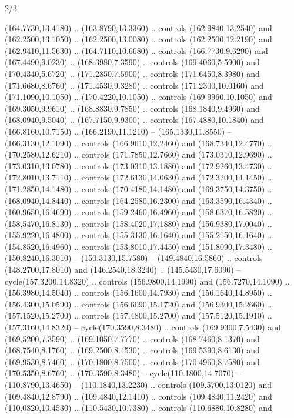 \begin{flagdescription}{2/3}
\begin{scope}[xshift=0.5\flaglength,yshift=0.5\flagwidth,scale=\stretchfactor]
\begin{scope}[scale=0.001645\flagwidth,yshift=65mm,xshift=-63mm]
\begin{scope}[y=0.80pt, x=0.80pt, yscale=-1,]
\begin{scope}[cm={{1.33333,0.0,0.0,1.33333,(0.0,1e-05)}}]
  (164.7730,13.4180) .. (163.8790,13.3360) .. controls (162.9840,13.2540) and
  (162.2500,13.1050) .. (162.2500,13.0080) .. controls (162.2500,12.2190) and
  (162.9410,11.5630) .. (164.7110,10.6680) .. controls (166.7730,9.6290) and
  (167.4490,9.0230) .. (168.3980,7.3590) .. controls (169.4060,5.5900) and
  (170.4340,5.6720) .. (171.2850,7.5900) .. controls (171.6450,8.3980) and
  (171.6680,8.6760) .. (171.4530,9.3280) .. controls (171.2300,10.0160) and
  (171.1090,10.1050) .. (170.4220,10.1050) .. controls (169.9960,10.1050) and
  (169.3050,9.9610) .. (168.8830,9.7850) .. controls (168.1840,9.4960) and
  (168.0940,9.5040) .. (167.7150,9.9300) .. controls (167.4880,10.1840) and
  (166.8160,10.7150) .. (166.2190,11.1210) -- (165.1330,11.8550) --
  (166.3130,12.1090) .. controls (166.9610,12.2460) and (168.7340,12.4770) ..
  (170.2580,12.6210) .. controls (171.7850,12.7660) and (173.0310,12.9690) ..
  (173.0310,13.0780) .. controls (173.0310,13.1880) and (172.9260,13.4730) ..
  (172.8010,13.7110) .. controls (172.6130,14.0630) and (172.3200,14.1450) ..
  (171.2850,14.1480) .. controls (170.4180,14.1480) and (169.3750,14.3750) ..
  (168.0940,14.8440) .. controls (164.2580,16.2300) and (163.3590,16.4340) ..
  (160.9650,16.4690) .. controls (159.2460,16.4960) and (158.6370,16.5820) ..
  (158.5470,16.8130) .. controls (158.4020,17.1880) and (156.9380,17.0040) ..
  (155.9220,16.4800) .. controls (155.3130,16.1640) and (155.2150,16.1640) ..
  (154.8520,16.4960) .. controls (153.8010,17.4450) and (151.8090,17.3480) ..
  (150.8240,16.3010) -- (150.3130,15.7580) -- (149.4840,16.5860) .. controls
  (148.2700,17.8010) and (146.2540,18.3240) .. (145.5430,17.6090) --
  cycle(157.3200,14.8320) .. controls (156.9800,14.1990) and (156.7270,14.1090)
  .. (156.3980,14.5040) .. controls (156.1600,14.7930) and (156.1640,14.8950) ..
  (156.4300,15.0590) .. controls (156.6090,15.1720) and (156.9300,15.2660) ..
  (157.1520,15.2700) .. controls (157.4800,15.2700) and (157.5120,15.1910) ..
  (157.3160,14.8320) -- cycle(170.3590,8.3480) .. controls (169.9300,7.5430) and
  (169.5200,7.3590) .. (169.1050,7.7770) .. controls (168.7460,8.1370) and
  (168.7540,8.1760) .. (169.2500,8.4530) .. controls (169.5390,8.6130) and
  (169.9530,8.7460) .. (170.1800,8.7500) .. controls (170.4960,8.7580) and
  (170.5350,8.6760) .. (170.3590,8.3480) -- cycle(110.1800,14.7070) --
  (110.8790,13.4650) -- (110.1840,13.2230) .. controls (109.5700,13.0120) and
  (109.4840,12.8790) .. (109.4840,12.1410) .. controls (109.4840,11.2420) and
  (110.0820,10.4530) .. (110.5430,10.7380) .. controls (110.6880,10.8280) and

\end{scope}
\end{scope}
\end{scope}
\end{scope}
\end{flagdescription}
